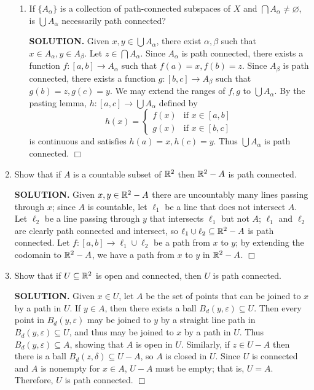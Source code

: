 \documentclass{article}
\begin{document}
\begin{enumerate}
\begin{enumerate}
        \item If $\{A_\alpha\}$ is a collection of path-connected subspaces of $X$ and $\bigcap A_\alpha \neq \varnothing$, is $\bigcup A_\alpha$ necessarily path connected?

        {\bf SOLUTION.} Given $x, y \in \bigcup A_\alpha$, there exist $\alpha, \beta$ such that $x \in A_\alpha, y \in A_\beta$. Let $z \in \bigcap A_\alpha$. Since $A_\alpha$ is path connected, there exists a function $f: [a, b] \rightarrow A_\alpha$ such that $f(a) = x, f(b) = z$. Since $A_\beta$ is path connected, there exists a function $g: [b, c] \rightarrow A_\beta$ such that $g(b) = z, g(c) = y$. We may extend the ranges of $f, g$ to $\bigcup A_\alpha$. By the pasting lemma, $h: [a, c] \rightarrow \bigcup A_\alpha$ defined by
        $$h(x) = \begin{cases}
            f(x) &\text{if } x\in [a, b]\\
            g(x) &\text{if }x \in [b, c]
        \end{cases}$$
        is continuous and satisfies $h(a) = x, h(c) = y$. Thus $\bigcup A_\alpha$ is path connected. $\Box$
    \end{enumerate}

    \item Show that if $A$ is a countable subset of $\mathbb{R}^2$ then $\mathbb{R}^2 - A$ is path connected.

    {\bf SOLUTION.} Given $x, y \in \mathbb{R}^2 - A$ there are uncountably many lines passing through $x$; since $A$ is countable, let $\ell_1$ be a line that does not intersect $A$. Let $\ell_2$ be a line passing through $y$ that intersects $\ell_1$ but not $A$; $\ell_1$ and $\ell_2$ are clearly path connected and intersect, so $\ell_1 \cup \ell_2 \subseteq \mathbb{R}^2 - A$ is path connected. Let $f: [a, b] \rightarrow \ell_1 \cup \ell_2$ be a path from $x$ to $y$; by extending the codomain to $\mathbb{R}^2 - A$, we have a path from $x$ to $y$ in $\mathbb{R}^2 - A$. $\Box$

    \item Show that if $U \subseteq \mathbb{R}^2$ is open and connected, then $U$ is path connected.

    {\bf SOLUTION.} Given $x \in U$, let $A$ be the set of points that can be joined to $x$ by a path in $U$. If $y \in A$, then there exists a ball $B_d(y, \varepsilon) \subseteq U$. Then every point in $B_d(y, \varepsilon)$ may be joined to $y$ by a straight line path in $B_d(y, \varepsilon) \subseteq U$, and thus may be joined to $x$ by a path in $U$. Thus $B_d(y, \varepsilon) \subseteq A$, showing that $A$ is open in $U$. Similarly, if $z \in U - A$ then there is a ball $B_d(z, \delta) \subseteq U-A$, so $A$ is closed in $U$. Since $U$ is connected and $A$ is nonempty for $x \in A$, $U - A$ must be empty; that is, $U = A$. Therefore, $U$ is path connected. $\Box$


\end{enumerate}
\end{document}
